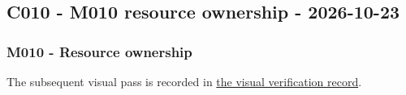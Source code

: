 \subsection{C010 - M010 resource ownership - 2026-10-23}\label{appendix-a103e7846d21-c010---m010-resource-ownership---2026-10-23}

\hypertarget{appendix-a103e7846d21-c010---m010-resource-ownership---2026-10-23}{}

\subsubsection{M010 - Resource ownership}\label{appendix-a103e7846d21-m010---resource-ownership}

\hypertarget{appendix-a103e7846d21-m010---resource-ownership}{}

The subsequent visual pass is recorded in \hyperref[appendix-a103e7846d21-visual-revision---2026-10-23]{the visual verification record}.

